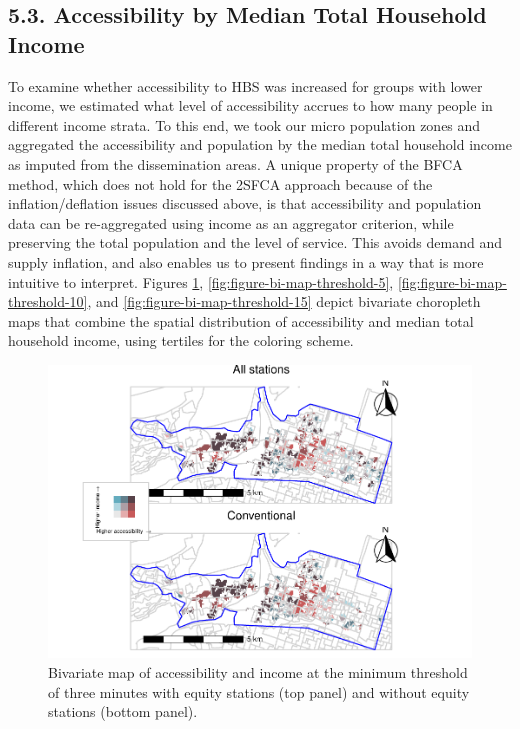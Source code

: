 \documentclass[]{elsarticle} %
\begin{document}
\hypertarget{accessibility-by-median-total-household-income}{%
\subsection{5.3. Accessibility by Median Total Household
Income}\label{accessibility-by-median-total-household-income}}

To examine whether accessibility to HBS was increased for groups with
lower income, we estimated what level of accessibility accrues to how
many people in different income strata. To this end, we took our micro
population zones and aggregated the accessibility and population by the
median total household income as imputed from the dissemination areas. A
unique property of the BFCA method, which does not hold for the 2SFCA
approach because of the inflation/deflation issues discussed above, is
that accessibility and population data can be re-aggregated using income
as an aggregator criterion, while preserving the total population and
the level of service. This avoids demand and supply inflation, and also
enables us to present findings in a way that is more intuitive to
interpret. Figures \ref{fig:figure-bi-map-threshold-3},
\ref{fig:figure-bi-map-threshold-5},
\ref{fig:figure-bi-map-threshold-10}, and
\ref{fig:figure-bi-map-threshold-15} depict bivariate choropleth maps
that combine the spatial distribution of accessibility and median total
household income, using tertiles for the coloring scheme.

\begin{figure}
\includegraphics[width=1.2\linewidth]{Bike-share-spatial-equity-R1_files/figure-latex/figure-bi-map-threshold-3-1} \caption{\label{fig-bivariate-map-threshold-3}Bivariate map of accessibility and income at the minimum threshold of three minutes with equity stations (top panel) and without equity stations (bottom panel).}\label{fig:figure-bi-map-threshold-3}
\end{figure}
\end{document}
